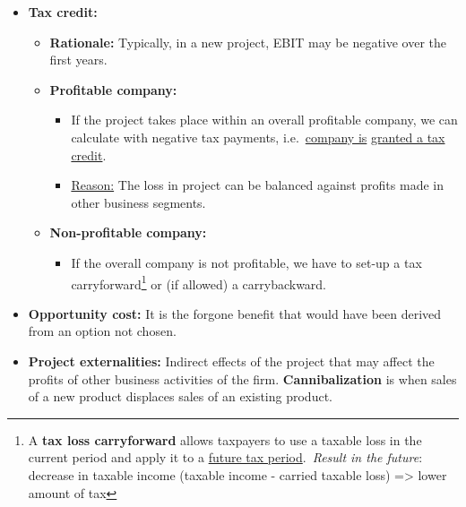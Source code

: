 \documentclass[ieeetran]{article}
\begin{document}
\begin{itemize}
\begin{itemize}
			\item \textbf{Note:}
				\begin{itemize}
				  \item Taxes paid by the company are lower as interest payment can be deducted from the tax base.
				  \item However, this \textbf{tax shield effect}\footnote{\textbf{Interest Tax Shield} refers to the tax savings \underline{resulting from the tax-deductibility of the} \underline{interest expense} on debt borrowings.} is taken into account in adjusting the cost of capital.
				\item Tax shield effect while calculating project's cash flows => there would be double counting 
				\end{itemize}
		\end{itemize}
\item \textbf{Tax credit:}
	\begin{itemize}
	  \item \textbf{Rationale:} Typically, in a new project, EBIT may be negative over the first years.
	  \item \textbf{Profitable company:}
		  \begin{itemize}
		    \item If the project takes place within an overall profitable company, we can calculate with negative tax payments, i.e.\ \underline{company is} \underline{granted a tax credit}.
		\item \underline{Reason:} The loss in project can be balanced against profits made in other business segments.
		  \end{itemize}
	\item \textbf{Non-profitable company:}
		\begin{itemize}
			\item If the overall company is not profitable, we have to set-up a tax carryforward\footnote{A \textbf{tax loss carryforward} allows taxpayers to use a taxable loss in the current period and apply it to a \underline{future tax period}.\ \textit{Result in the future}: decrease in taxable income (taxable income - carried taxable loss) => lower amount of tax} or (if allowed) a carrybackward.
		\end{itemize}
	\end{itemize}
\item \textbf{Opportunity cost:} It is the forgone benefit that would have been derived from an option not chosen.

\item \textbf{Project externalities:} Indirect effects of the project that may affect the profits of other business activities of the firm. \textbf{Cannibalization} is when sales of a new product displaces sales of an existing product.


\end{itemize}
\end{document}
